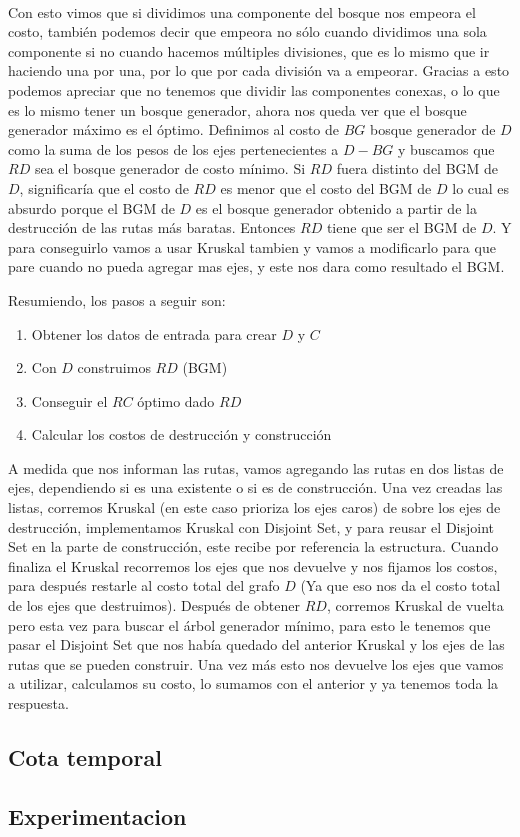 \\
\par
Con esto vimos que si dividimos una componente del bosque nos empeora el costo, también podemos decir que empeora no sólo cuando dividimos una sola componente si no cuando hacemos múltiples divisiones, que es lo mismo que ir haciendo una por una, por lo que por cada división va a empeorar. Gracias a esto podemos apreciar que no tenemos que dividir las componentes conexas, o lo que es lo mismo tener un bosque generador, ahora nos queda ver que el bosque generador máximo es el óptimo. Definimos al costo de $BG$ bosque generador de $D$  como la suma de los pesos de los ejes pertenecientes a $D - BG$ y buscamos que $RD$ sea el bosque generador de costo mínimo. Si $RD$ fuera distinto del BGM de $D$, significaría que el costo de $RD$ es menor que el costo del BGM de $D$ lo cual es absurdo porque el BGM de $D$ es el bosque generador obtenido a partir de la destrucción de las rutas más baratas. Entonces $RD$ tiene que ser el BGM de $D$. Y para conseguirlo vamos a usar Kruskal tambien y vamos a modificarlo para que pare cuando no pueda agregar mas ejes, y este nos dara como resultado el BGM.
\\
\par
Resumiendo, los pasos a seguir son:
\begin{enumerate}
\item Obtener los datos de entrada para crear $D$ y $C$
\item Con $D$ construimos $RD$ (BGM) 
\item Conseguir el $RC$ óptimo dado $RD$
\item Calcular los costos de destrucción y construcción
\end{enumerate}

A medida que nos informan las rutas, vamos agregando las rutas en dos listas de ejes, dependiendo si es una existente o si es de construcción. Una vez creadas las listas, corremos Kruskal (en este caso prioriza los ejes caros) de sobre los ejes de destrucción, implementamos Kruskal con Disjoint Set, y para reusar el Disjoint Set en la parte de construcción, este recibe por referencia la estructura. Cuando finaliza el Kruskal recorremos los ejes que nos devuelve y nos fijamos los costos, para después restarle al costo total del grafo $D$ (Ya que eso nos da el costo total de los ejes que destruimos). Después de obtener $RD$, corremos Kruskal de vuelta pero esta vez para buscar el árbol generador mínimo, para esto le tenemos que pasar el Disjoint Set que nos había quedado del anterior Kruskal  y los ejes de las rutas que se pueden construir. Una vez más esto nos devuelve los ejes que vamos a utilizar, calculamos su costo, lo sumamos con el anterior y ya tenemos toda la respuesta.

\subsection{Cota temporal}

\subsection{Experimentacion}

\pagebreak
